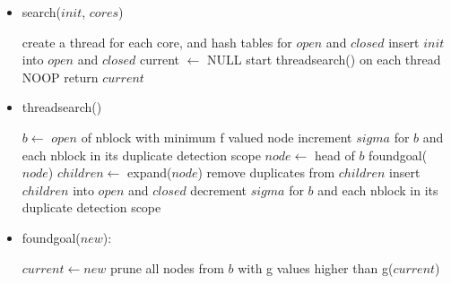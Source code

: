 \documentclass{article}
\begin{document}
\begin{itemize}
  \item search($init$, $cores$)
  \begin{algorithmic}[1]
  \STATE create a thread for each core, and hash tables for $open$ and $closed$
  \STATE insert $init$ into $open$ and $closed$
  \STATE current $\leftarrow$ NULL
  \STATE start threadsearch() on each thread
    \STATE NOOP
  \ENDWHILE
  \STATE return $current$
  \end{algorithmic}

  \item threadsearch()
  \begin{algorithmic}[1]
    \STATE $b \leftarrow$ $open$ of nblock with minimum f valued node
    \STATE increment $sigma$ for $b$ and each nblock in its duplicate detection scope
    \STATE {}
    \STATE {}
      \STATE $node \leftarrow$ head of $b$
        \STATE foundgoal($node$)
        \STATE $children \leftarrow$ expand($node$)
        \STATE remove duplicates from $children$
        \STATE insert $children$ into $open$ and $closed$
      \ENDIF
    \ENDFOR
    \STATE decrement $sigma$ for $b$ and each nblock in its duplicate detection scope
  \ENDWHILE
  \end{algorithmic}

  \item foundgoal($new$):
  \begin{algorithmic}[1]
        \STATE $current \leftarrow new$
        \STATE prune all nodes from $b$ with g values higher than g($current$)
      \ENDIF
  \end{algorithmic}
\end{itemize}
\end{document}
